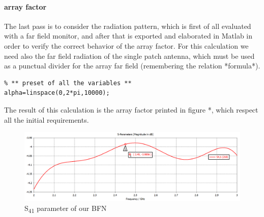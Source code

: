 \paragraph{array factor} The last pass is to consider the radiation pattern, which is first of all evaluated with a far field monitor, and after that is exported and elaborated in Matlab in order to verify the correct behavior of the array factor. For this calculation we need also the far field radiation of the single patch antenna, which must be used as a punctual divider for the array far field (remembering the relation *formula*).
\begin{lstlisting}
% ** preset of all the variables **
alpha=linspace(0,2*pi,10000);
\end{lstlisting}
The result of this calculation is the array factor printed in figure *, which respect all the initial requirements.
\begin{figure}[H]
	\centering
	\includegraphics[scale=0.35]{S41Amp.png}
	\caption{S\textsubscript{41} parameter of our BFN}
	\label{S41Amp}
\end{figure}